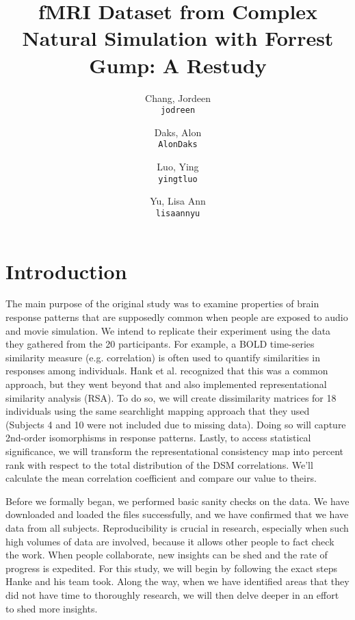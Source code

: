 \documentclass[11pt]{article}
\title{fMRI Dataset from Complex Natural Simulation with Forrest Gump: A Restudy}
\author{
  Chang, Jordeen\\
  \texttt{jodreen}
  \and
  Daks, Alon\\
  \texttt{AlonDaks}
  \and
  Luo, Ying\\
  \texttt{yingtluo}
  \and
  Yu, Lisa Ann\\
  \texttt{lisaannyu}
}
\begin{document}
\maketitle  


\section{Introduction}

The main purpose of the original study was to examine properties of brain response
patterns that are supposedly common when people are exposed to audio and movie
simulation. We intend to replicate their experiment using the data they gathered
from the 20 participants. For example, a BOLD time-series similarity measure
(e.g. correlation) is often used to quantify similarities in responses among
individuals. Hank et al. recognized that this was a common approach, but they
went beyond that and also implemented representational similarity analysis 
(RSA). To do so, we will create dissimilarity matrices for 18 individuals using
the same searchlight mapping approach that they used (Subjects 4 and 10 were not
included due to missing data). Doing so will capture 2nd-order isomorphisms in
response patterns. Lastly, to access statistical significance, we will transform
the representational consistency map into percent rank with respect to the total
distribution of the DSM correlations. We'll calculate the mean correlation
coefficient and compare our value to theirs.

Before we formally began, we performed basic sanity checks on the data. We
have downloaded and loaded the files successfully, and we have confirmed that
we have data from all subjects. Reproducibility is crucial in research, especially
when such high volumes of data are involved, because it allows other people to
fact check the work. When people collaborate, new insights can be shed and the
rate of progress is expedited. For this study, we will begin by following the 
exact steps Hanke and his team took. Along the way, when we have identified areas
that they did not have time to thoroughly research, we will then delve deeper in
an effort to shed more insights.
\end{document}
